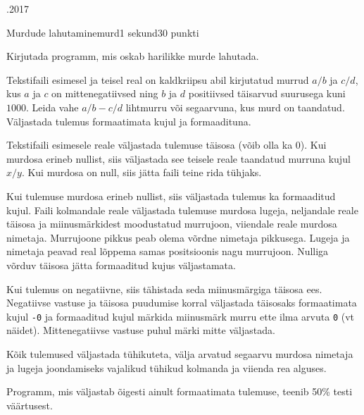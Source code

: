 \documentclass[a4paper,11pt]{article}
\begin{document}
\begin{ol}{\eio}{.2017}{\yle}{}
\begin{yl}{2}{Murdude lahutamine}{murd}{1 sekund}{30 punkti}

Kirjutada programm, mis oskab harilikke murde lahutada.

\sis Tekstifaili \sisf esimesel ja teisel real on kaldkriipsu abil kirjutatud murrud $a/b$ ja $c/d$, kus $a$ ja $c$ on mittenegatiivsed ning $b$ ja $d$ positiivsed täisarvud suurusega kuni $1000$. Leida vahe $a/b-c/d$ lihtmurru või segaarvuna, kus murd on taandatud. Väljastada tulemus formaatimata kujul ja formaadituna.

\val Tekstifaili \valf esimesele reale väljastada tulemuse täisosa (võib olla ka 0). Kui murdosa erineb nullist, siis väljastada see teisele reale taandatud murruna kujul $x/y$. Kui murdosa on null, siis jätta faili teine rida tühjaks.

Kui tulemuse murdosa erineb nullist, siis väljastada tulemus ka formaaditud kujul. Faili kolmandale reale väljastada tulemuse murdosa lugeja, neljandale reale täisosa ja miinusmärkidest moodustatud murrujoon, viiendale reale murdosa nimetaja. Murrujoone pikkus peab olema võrdne nimetaja pikkusega. Lugeja ja nimetaja peavad real lõppema samas positsioonis nagu murrujoon. Nulliga võrduv täisosa jätta formaaditud kujus väljastamata.

Kui tulemus on negatiivne, siis tähistada seda miinusmärgiga täisosa ees. Negatiivse vastuse ja täisosa puudumise korral väljastada täisosaks formaatimata kujul \verb'-0' ja formaaditud kujul märkida miinusmärk murru ette ilma arvuta \verb'0' (vt näidet). Mittenegatiivse vastuse puhul märki mitte väljastada.

Kõik tulemused väljastada tühikuteta, välja arvatud segaarvu murdosa nimetaja ja lugeja joondamiseks vajalikud tühikud kolmanda ja viienda rea alguses.

\nde[0]{3cm}{3cm}

\nde[1]{3cm}{3cm}

\nde[2]{3cm}{3cm}

\hnd Programm, mis väljastab õigesti ainult formaatimata tulemuse, teenib 50\% testi väärtusest.

\end{yl}
\end{ol}
\end{document}
